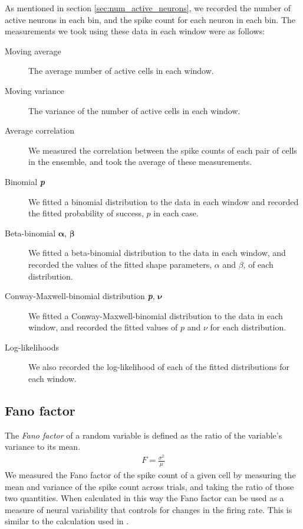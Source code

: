     As mentioned in section \ref{sec:num_active_neurons}, we recorded the number of active neurons in each bin, and the spike count for each neuron in each bin. The measurements we took using these data in each window were as follows:
    \begin{description}
      \item[Moving average] The average number of active cells in each window.
      \item[Moving variance] The variance of the number of active cells in each window.
      \item[Average correlation] We measured the correlation between the spike counts of each pair of cells in the ensemble, and took the average of these measurements.
      \item[Binomial \textit{\textbf{p}}] We fitted a binomial distribution to the data in each window and recorded the fitted probability of success, $p$ in each case.
      \item[Beta-binomial $\boldsymbol{\alpha}$, $\boldsymbol{\beta}$] We fitted a beta-binomial distribution to the data in each window, and recorded the values of the fitted shape parameters, $\alpha$ and $\beta$, of each distribution.
      \item[Conway-Maxwell-binomial distribution \textit{\textbf{p}}, $\boldsymbol{\nu}$] We fitted a Conway-Maxwell-binomial distribution to the data in each window, and recorded the fitted values of $p$ and $\nu$ for each distribution.
      \item[Log-likelihoods] We also recorded the log-likelihood of each of the fitted distributions for each window.
    \end{description}

    \subsection{Fano factor}\label{sec:fano_factor}
    The \textit{Fano factor} of a random variable is defined as the ratio of the variable's variance to its mean.
    \begin{align}\label{eq:fano_factor}
      F = \frac{\sigma^2}{\mu}
    \end{align}
    We measured the Fano factor of the spike count of a given cell by measuring the mean and variance of the spike count across trials, and taking the ratio of those two quantities. When calculated in this way the Fano factor can be used as a measure of neural variability that controls for changes in the firing rate.  This is similar to the calculation used in \parencite{Churchland}.

